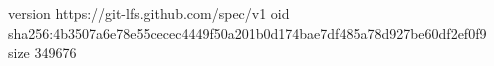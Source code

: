 version https://git-lfs.github.com/spec/v1
oid sha256:4b3507a6e78e55cecec4449f50a201b0d174bae7df485a78d927be60df2ef0f9
size 349676
